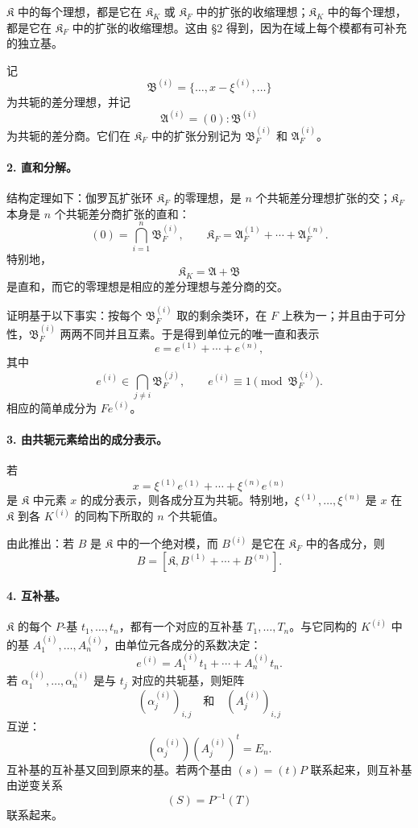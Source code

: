 \(\mathfrak K\) 中的每个理想，都是它在 \(\mathfrak K_K\) 或 \(\mathfrak K_F\) 中的扩张的收缩理想；\(\mathfrak K_K\) 中的每个理想，都是它在 \(\mathfrak K_F\) 中的扩张的收缩理想。这由 §2 得到，因为在域上每个模都有可补充的独立基。

记
\[
        \mathfrak B^{(i)}=\{\ldots,x-\xi^{(i)},\ldots\}
\]
为共轭的差分理想，并记
\[
        \mathfrak A^{(i)}=(0):\mathfrak B^{(i)}
\]
为共轭的差分商。它们在 \(\mathfrak K_F\) 中的扩张分别记为 \(\mathfrak B_F^{(i)}\) 和 \(\mathfrak A_F^{(i)}\)。

\paragraph{2. 直和分解。}
结构定理如下：伽罗瓦扩张环 \(\mathfrak K_F\) 的零理想，是 \(n\) 个共轭差分理想扩张的交；\(\mathfrak K_F\) 本身是 \(n\) 个共轭差分商扩张的直和：
\[
        (0)=\bigcap_{i=1}^n \mathfrak B_F^{(i)},
        \qquad
        \mathfrak K_F=\mathfrak A_F^{(1)}+\cdots+\mathfrak A_F^{(n)}.
\]
特别地，
\[
        \mathfrak K_K=\mathfrak A+\mathfrak B
\]
是直和，而它的零理想是相应的差分理想与差分商的交。

证明基于以下事实：按每个 \(\mathfrak B_F^{(i)}\) 取的剩余类环，在 \(F\) 上秩为一；并且由于可分性，\(\mathfrak B_F^{(i)}\) 两两不同并且互素。于是得到单位元的唯一直和表示
\[
        e=e^{(1)}+\cdots+e^{(n)},
\]
其中
\[
        e^{(i)}\in \bigcap_{j\ne i}\mathfrak B_F^{(j)},
        \qquad
        e^{(i)}\equiv 1\pmod{\mathfrak B_F^{(i)}}.
\]
相应的简单成分为 \(Fe^{(i)}\)。

\paragraph{3. 由共轭元素给出的成分表示。}
若
\[
        x=\xi^{(1)}e^{(1)}+\cdots+\xi^{(n)}e^{(n)}
\]
是 \(\mathfrak K\) 中元素 \(x\) 的成分表示，则各成分互为共轭。特别地，\(\xi^{(1)},\ldots,\xi^{(n)}\) 是 \(x\) 在 \(\mathfrak K\) 到各 \(K^{(i)}\) 的同构下所取的 \(n\) 个共轭值。

由此推出：若 \(B\) 是 \(\mathfrak K\) 中的一个绝对模，而 \(B^{(i)}\) 是它在 \(\mathfrak K_F\) 中的各成分，则
\[
        B=[\mathfrak K,B^{(1)}+\cdots+B^{(n)}].
\]

\paragraph{4. 互补基。}
\(\mathfrak K\) 的每个 \(P\)-基 \(t_1,\ldots,t_n\)，都有一个对应的互补基 \(T_1,\ldots,T_n\)。与它同构的 \(K^{(i)}\) 中的基 \(A_1^{(i)},\ldots,A_n^{(i)}\)，由单位元各成分的系数决定：
\[
        e^{(i)}=A_1^{(i)}t_1+
        \cdots+A_n^{(i)}t_n.
\]
若 \(\alpha_1^{(i)},\ldots,\alpha_n^{(i)}\) 是与 \(t_j\) 对应的共轭基，则矩阵
\[
        (\alpha_j^{(i)})_{i,j}
        \quad\text{和}\quad
        (A_j^{(i)})_{i,j}
\]
互逆：
\[
        (\alpha_j^{(i)})(A_j^{(i)})^{t}=E_n.
\]
互补基的互补基又回到原来的基。若两个基由 \((s)=(t)P\) 联系起来，则互补基由逆变关系
\[
        (S)=P^{-1}(T)
\]
联系起来。

